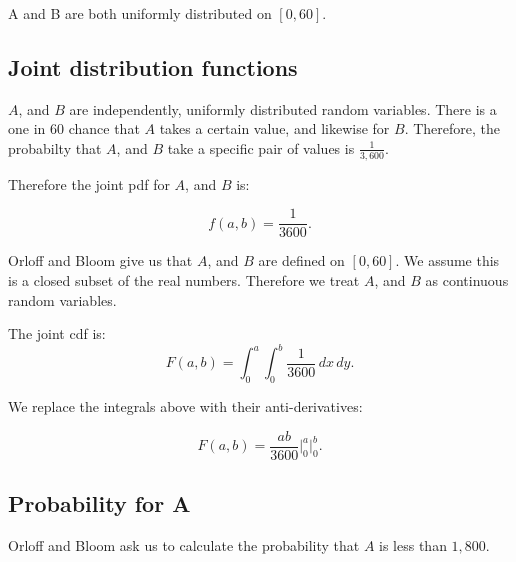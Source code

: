 \documentclass[a5paper,11pt]{article}
\begin{document}
A and B are both uniformly distributed on
$\left[0,60\right]$.

\subsection{Joint distribution functions}
$A$, and $B$ are independently, uniformly
distributed random variables. There is a 
one in 60 chance that $A$ takes a 
certain value, and likewise for $B$.
Therefore, the probabilty that $A$, and
$B$ take a specific pair of values is
$\frac{1}{3,600}$.

Therefore the joint pdf for $A$, and $B$
is:

\begin{equation}
f\left(a, b \right) = \frac{1}{3600}.
\end{equation}

Orloff and Bloom give us that $A$, and $B$
are defined on $\left[0,60\right]$. We 
assume this is a closed subset of the real
numbers. Therefore we treat $A$, and $B$ as
continuous random variables.

The joint cdf is:
\begin{equation}
F\left(a,b\right)=
\int_{0}^{a} \int_{0}^{b}
\frac{1}{3600} \,dx \,dy.
\end{equation}

We replace the integrals above with their
anti-derivatives:

\begin{equation}
F\left(a,b\right)=
\frac{ab}{3600} \bigg\rvert_0^a
\bigg\rvert_0^b.
\end{equation}

\subsection{Probability for A}
Orloff and Bloom ask us to calculate the
probability that $A$ is less than $1,800$.




\printbibliography{}
\end{document}
